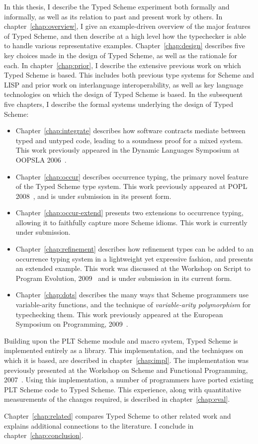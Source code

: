 In this thesis, I describe the Typed Scheme experiment both formally
and informally, 
as well as its relation to past and present work by others.  In
chapter~\ref{chap:overview}, I give an example-driven overview of the
major features of Typed Scheme, and then describe at a high level how
the typechecker is able to handle various representative examples.
Chapter~\ref{chap:design} describes five key choices made in the
design of Typed Scheme, as well as the rationale for each.
In
chapter~\ref{chap:prior}, I describe the extensive previous work on
which Typed Scheme is based.  This includes both previous type systems
for Scheme and LISP and prior work on interlanguage interoperability, as well as
key language technologies on which  
the design of Typed Scheme is based.  In the subsequent five chapters, I
describe the formal systems underlying the design of Typed Scheme:
\begin{itemize}
\item Chapter~\ref{chap:integrate} describes how software contracts
  mediate between typed and untyped code, leading to a soundness proof
  for a mixed system.  This work previously appeared in the Dynamic
  Languages Symposium at OOPSLA 2006~\cite{thf:dls2006}.
\item Chapter~\ref{chap:occur} describes occurrence typing, the primary
  novel feature of the Typed Scheme type system.  This work previously
  appeared at POPL 2008~\cite{thf:popl08}, and is under submission in
  its present form. 
\item Chapter~\ref{chap:occur-extend} presents two extensions to
  occurrence typing, allowing it to faithfully capture more Scheme
  idioms.  This work is currently under submission.
\item Chapter~\ref{chap:refinement} describes how refinement types can
  be added to an occurrence typing system in a lightweight yet
  expressive fashion, and presents an extended example.  This work was
  discussed at the Workshop on Script to Program Evolution,
  2009~\cite{thf:stop09} and is under submission in its current form.
\item Chapter~\ref{chap:dots} describes the many ways that Scheme
  programmers use variable-arity functions, and the technique of
  \emph{variable-arity polymorphism} for typechecking them.
 This work previously appeared at the European Symposium on
 Programming, 2009~\cite{sthf:variable-arity}.
\end{itemize}

Building upon the PLT Scheme module and macro system, Typed Scheme is
implemented entirely as a library.  This implementation, and the
techniques on which it is based, are described in
chapter~\ref{chap:impl}.   The implementation was previously presented
at the Workshop on Scheme and Functional Programming,
2007~\cite{ctf:macros}.  Using this implementation, a number of
programmers have ported existing PLT Scheme code to Typed Scheme.
This experience, along with quantitative measurements of the changes
required, is described in chapter~\ref{chap:eval}.  

Chapter~\ref{chap:related} compares Typed Scheme to other related work
and explains additional connections to the literature.
I conclude in chapter~\ref{chap:conclusion}.


